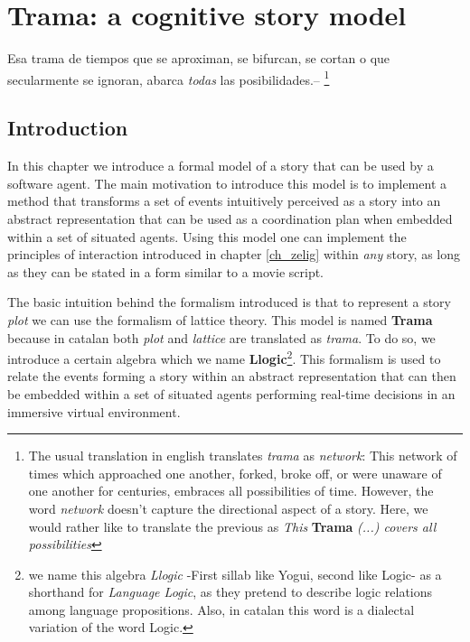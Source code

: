 \documentclass[
		twoside,openright,titlepage,numbers=noenddot,manychapters,
		headinclude,%
                footinclude=false,cleardoublepage=empty,
                BCOR=5mm,
		fontsize=11pt, %
                 enabledeprecatedfontcommands]{scrreprt}
\begin{document}
\cleardoublepage




\chapter{Trama: a cognitive story model}
\thispagestyle{empty}

\label{ch_trama}



\begin{origquote}
   Esa trama de tiempos que se aproximan, se bifurcan, se cortan o que secularmente se ignoran, abarca \emph{todas} las posibilidades.-- \cite{borges1942jss}\footnote{The usual translation in english translates \emph{trama} as \emph{network}: This network of times which approached one another, forked, broke off, or were unaware of one another for centuries, embraces all possibilities of time. However, the word \emph{network} doesn't capture the directional aspect of a story. Here, we would rather like to translate the previous as \emph{This} \textbf{Trama} \emph{ (...) covers all possibilities  }}

\end{origquote}



\section{Introduction}


In this chapter  we introduce a formal model of a story that can be used by a software agent.  The main motivation to introduce this model is to implement a method that transforms a set of events intuitively perceived as a story into an abstract representation that can be used as a  coordination plan when embedded within a set of situated agents. 
Using this model one can implement the principles of interaction introduced in chapter \ref{ch_zelig} within \emph{any} story, as long as they can be stated in a form similar to a movie script.


The basic intuition behind the formalism introduced is that to represent a story \emph{plot} we can use the formalism of lattice theory. This model is named \textbf{Trama}  because in catalan both \emph{plot} and \emph{lattice} are translated as \emph{trama}. 
To do so, we introduce a certain algebra which we name \textbf{Llogic}\footnote{ we name this algebra \emph{Llogic} -First sillab like Yogui, second like Logic- as a shorthand for \emph{Language Logic}, as they pretend to describe logic relations among language propositions. Also, in catalan this word is a dialectal variation of the word Logic.}. This formalism is used to relate the events forming a story within an abstract representation that can then be embedded within a set of situated agents performing real-time decisions in an immersive virtual environment.
\end{document}
